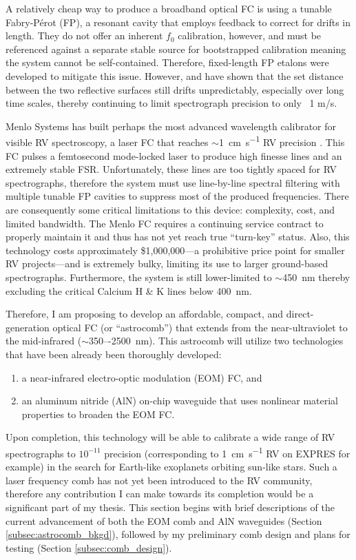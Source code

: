 \documentclass[11pt]{article}
\begin{document}
A relatively cheap way to produce a broadband optical FC is using a tunable Fabry-Pérot (FP), a resonant cavity that employs feedback to correct for drifts in length. They do not offer an inherent $f_0$ calibration, however, and must be referenced against a separate stable source for bootstrapped calibration \citep{McCracken2014, Sturmer2017} meaning the system cannot be self-contained. Therefore, fixed-length FP etalons were developed to mitigate this issue. However, \citet{Reiners2014} and \citet{Wildi2012} have shown that the set distance between the two reflective surfaces still drifts unpredictably, especially over long time scales, thereby continuing to limit spectrograph precision to only ~1 m/s.

Menlo Systems has built perhaps the most advanced wavelength calibrator for visible RV spectroscopy, a laser FC that reaches $\sim$\SI{1}{\centi\meter\per\second} RV precision \citep{Probst2014}. This FC pulses a femtosecond mode-locked laser to produce high finesse lines and an extremely stable FSR. Unfortunately, these lines are too tightly spaced for RV spectrographs, therefore the system must use line-by-line spectral filtering with multiple tunable FP cavities to suppress most of the produced frequencies. There are consequently some critical limitations to this device: complexity, cost, and limited bandwidth. The Menlo FC requires a continuing service contract to properly maintain it and thus has not yet reach true ``turn-key'' status. Also, this technology costs approximately \$1,000,000---a prohibitive price point for smaller RV projects---and is extremely bulky, limiting its use to larger ground-based spectrographs. Furthermore, the system is still lower-limited to $\sim$\SI{450}{\nano\meter} thereby excluding the critical Calcium H \& K lines below \SI{400}{\nano\meter}.

Therefore, I am proposing to develop an affordable, compact, and direct-generation optical FC (or ``astrocomb'') that extends from the near-ultraviolet to the mid-infrared ($\sim$350–-\SI{2500}{\nano\meter}). This astrocomb will utilize two technologies that have been already been thoroughly developed:
\begin{enumerate}
    \item a near-infrared electro-optic modulation (EOM) FC, and
    \item an aluminum nitride (AlN) on-chip waveguide that uses nonlinear material properties to broaden the EOM FC.
\end{enumerate}
Upon completion, this technology will be able to calibrate a wide range of RV spectrographs to $10^{-11}$ precision (corresponding to \SI{1}{\centi\meter\per\second} RV on EXPRES for example) in the search for Earth-like exoplanets orbiting sun-like stars. Such a laser frequency comb has not yet been introduced to the RV community, therefore any contribution I can make towards its completion would be a significant part of my thesis. This section begins with brief descriptions of the current advancement of both the EOM comb and AlN waveguides (Section \ref{subsec:astrocomb_bkgd}), followed by my preliminary comb design and plans for testing (Section \ref{subsec:comb_design}).
\end{document}
